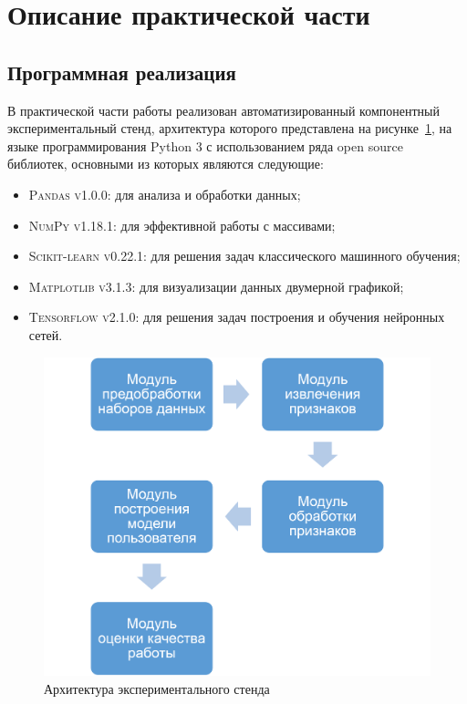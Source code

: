 \documentclass[12pt]{article}
\begin{document}
    \newpage



    \section{Описание практической части}
    \label{sec:PracticalPart}

    \subsection{Программная реализация}
    \label{sec:PracticalPart:Software}

    \par В практической части работы реализован автоматизированный компонентный экспериментальный стенд, архитектура которого представлена на рисунке~\ref{sec:PracticalPart:Software:fig:Architecture}, на языке программирования Python 3 с использованием ряда open source библиотек, основными из которых являются следующие:

    \begin{itemize}
        \item \textsc{Pandas v1.0.0}: для анализа и обработки данных;
        \item \textsc{NumPy v1.18.1}: для эффективной работы с массивами;
        \item \textsc{Scikit-learn v0.22.1}: для решения задач классического машинного обучения;
        \item \textsc{Matplotlib v3.1.3}: для визуализации данных двумерной графикой;
        \item \textsc{Tensorflow v2.1.0}: для решения задач построения и обучения нейронных сетей.
    \end{itemize}

    \begin{figure}[h!]
        \centering
        \includegraphics[width=0.9\linewidth]{architecture.png}
        \caption{Архитектура экспериментального стенда}
        \label{sec:PracticalPart:Software:fig:Architecture}
    \end{figure}
\end{document}
